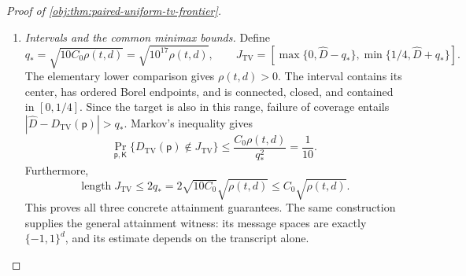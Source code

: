 \begin{proof}[Proof of \cref{obj:thm:paired-uniform-tv-frontier}]
\begin{enumerate}
The global-polynomial conclusion of
\cref{obj:lem:finite-private-polynomial-calibration} now yields
\[
\mathbb E(\widehat F-F(\theta))^2
\le\frac{e^{9DH}}{2d}+\frac1{(D+1)^2}.
\]
The degree budget gives \(9DH\le L/100\).
For \(L\ge4096\), the elementary exponential inequalities
\[
L^2\le16e^{L/2},
\qquad
4\le e^{49L/100-1}
\]
imply
\[
L^2e^{L/100}\le4e^{L-1}=4d.
\]
Therefore
\[
\frac{e^{9DH}}{2d}\le\frac2{L^2}\le2\rho(t,d),
\qquad
\frac1{D+1}\le\frac{2048H}{L}
\le\frac{12288w}{L},
\]
and hence
\[
\frac1{(D+1)^2}\le150994944\,\rho(t,d).
\]
The elementary lower comparison, together with \(\rho(t,d)<1\), gives
\(t^{-1}\le\rho(t,d)\). Thus
\[
\frac{24}{t}
+\frac12\left(\frac{e^{9DH}}{2d}+\frac1{(D+1)^2}\right)
\le75497500\,\rho(t,d)
\le C_0\rho(t,d).
\]
Clipping again completes the risk bound. Every admissible tuple has therefore been covered:
\[
\sup_{\mathsf p\in\mathcal P_d^{\mathrm{pair}}}
\mathbb E_{\mathsf p,\mathsf K}
(\widehat D-D_{\mathrm{TV}}(\mathsf p))^2
\le C_0\rho(t,d).
\]

\item \textit{Intervals and the common minimax bounds.}
Define
\[
q_*=\sqrt{10C_0\rho(t,d)}=\sqrt{10^{17}\rho(t,d)},
\qquad
J_{\mathrm{TV}}
=
\left[
\max\{0,\widehat D-q_*\},
\min\{1/4,\widehat D+q_*\}
\right].
\]
The elementary lower comparison gives \(\rho(t,d)>0\).
The interval contains its center, has ordered Borel endpoints, and is connected, closed, and contained in \([0,1/4]\).
Since the target is also in this range, failure of coverage entails
\(|\widehat D-D_{\mathrm{TV}}(\mathsf p)|>q_*\). Markov's inequality gives
\[
\Pr_{\mathsf p,\mathsf K}
\{D_{\mathrm{TV}}(\mathsf p)\notin J_{\mathrm{TV}}\}
\le\frac{C_0\rho(t,d)}{q_*^2}
=\frac1{10}.
\]
Furthermore,
\[
\operatorname{length}J_{\mathrm{TV}}
\le2q_*
=2\sqrt{10C_0}\sqrt{\rho(t,d)}
\le C_0\sqrt{\rho(t,d)}.
\]
This proves all three concrete attainment guarantees.
The same construction supplies the general attainment witness: its message spaces are exactly \(\{-1,1\}^d\), and its estimate depends on the transcript alone.


\end{enumerate}
\end{proof}

